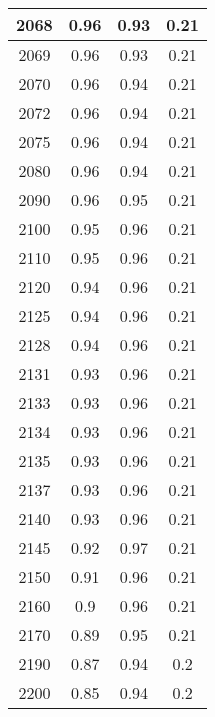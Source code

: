 \documentclass[a4paper, usenames, dvipsnames]{article}
\begin{document}
\begin{table}[p]
\begin{tabular}{|c|c|c|c|}
        \hline
        2068       & 0.96     & 0.93     & 0.21     \\
        \hline
        2069       & 0.96     & 0.93     & 0.21     \\
        \hline
        2070       & 0.96     & 0.94     & 0.21     \\
        \hline
        2072       & 0.96     & 0.94     & 0.21     \\
        \hline
        2075       & 0.96     & 0.94     & 0.21     \\
        \hline
        2080       & 0.96     & 0.94     & 0.21     \\
        \hline
        2090       & 0.96     & 0.95     & 0.21     \\
        \hline
        2100       & 0.95     & 0.96     & 0.21     \\
        \hline
        2110       & 0.95     & 0.96     & 0.21     \\
        \hline
        2120       & 0.94     & 0.96     & 0.21     \\
        \hline
        2125       & 0.94     & 0.96     & 0.21     \\
        \hline
        2128       & 0.94     & 0.96     & 0.21     \\
        \hline
        2131       & 0.93     & 0.96     & 0.21     \\
        \hline
        2133       & 0.93     & 0.96     & 0.21     \\
        \hline
        2134       & 0.93     & 0.96     & 0.21     \\
        \hline
        2135       & 0.93     & 0.96     & 0.21     \\
        \hline
        2137       & 0.93     & 0.96     & 0.21     \\
        \hline
        2140       & 0.93     & 0.96     & 0.21     \\
        \hline
        2145       & 0.92     & 0.97     & 0.21     \\
        \hline
        2150       & 0.91     & 0.96     & 0.21     \\
        \hline
        2160       & 0.9      & 0.96     & 0.21     \\
        \hline
        2170       & 0.89     & 0.95     & 0.21     \\
        \hline
        2190       & 0.87     & 0.94     & 0.2      \\
        \hline
        2200       & 0.85     & 0.94     & 0.2      \\

\end{tabular}
\end{table}
\end{document}
